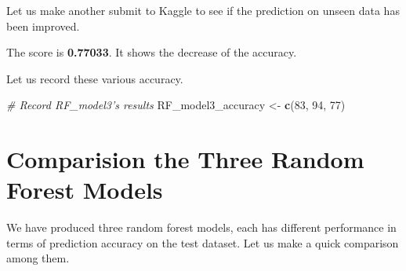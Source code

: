 \documentclass[
]{book}
\newenvironment{Shaded}{\begin{snugshade}}{\end{snugshade}}
\newcommand{\CommentTok}[1]{\textcolor[rgb]{0.56,0.35,0.01}{\textit{#1}}}
\newcommand{\DataTypeTok}[1]{\textcolor[rgb]{0.13,0.29,0.53}{#1}}
\newcommand{\DecValTok}[1]{\textcolor[rgb]{0.00,0.00,0.81}{#1}}
\newcommand{\KeywordTok}[1]{\textcolor[rgb]{0.13,0.29,0.53}{\textbf{#1}}}
\newcommand{\NormalTok}[1]{#1}
\newcommand{\OperatorTok}[1]{\textcolor[rgb]{0.81,0.36,0.00}{\textbf{#1}}}
\newcommand{\OtherTok}[1]{\textcolor[rgb]{0.56,0.35,0.01}{#1}}
\newcommand{\StringTok}[1]{\textcolor[rgb]{0.31,0.60,0.02}{#1}}
\begin{document}
Let us make another submit to Kaggle to see if the prediction on unseen data has been improved.

\begin{Shaded}
\end{Shaded}

The score is \textbf{0.77033}. It shows the decrease of the accuracy.

Let us record these various accuracy.

\begin{Shaded}
\begin{Highlighting}[]
\CommentTok{# Record RF_model3's results}
\NormalTok{RF_model3_accuracy <-}\StringTok{ }\KeywordTok{c}\NormalTok{(}\DecValTok{83}\NormalTok{, }\DecValTok{94}\NormalTok{, }\DecValTok{77}\NormalTok{)}
\end{Highlighting}
\end{Shaded}

\hypertarget{comparision-the-three-random-forest-models}{%
\section{Comparision the Three Random Forest Models}\label{comparision-the-three-random-forest-models}}

We have produced three random forest models, each has different performance in terms of prediction accuracy on the test dataset. Let us make a quick comparison among them.
\end{document}
